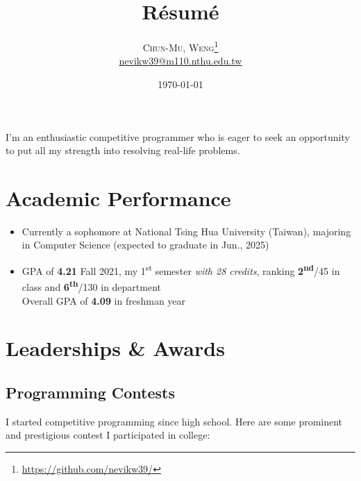 \documentclass[12pt, a4paper]{article}
\title{R\'{e}sum\'{e}}
\author{\textsc{Chun-Mu, Weng}\footnote{\url{https://github.com/nevikw39/}}\\{\footnotesize\href{mailto:nevikw39@m110.nthu.edu.tw}{\ttfamily nevikw39@m110.nthu.edu.tw}}}
\date{\today}
\begin{document}
\maketitle

I'm an enthusiastic competitive programmer who is eager to seek an opportunity to put all my strength into resolving real-life problems.

\section{Academic Performance}

%

\begin{itemize}
\item Currently a sophomore at National Tsing Hua University (Taiwan), majoring in \textsf{Computer Science} (expected to graduate in Jun., 2025)
\item GPA of \textbf{4.21} Fall 2021, my 1\textsuperscript{st} semester \emph{with 28 credits}, ranking \textbf{2\textsuperscript{nd}}/45 in class and \textbf{6\textsuperscript{th}}/130 in department\\
Overall GPA of \textbf{4.09} in freshman year
\end{itemize}

\section{Leaderships \& Awards}

\subsection{Programming Contests}


I started competitive programming since high school. Here are some prominent and prestigious contest I participated in college:
\end{document}
